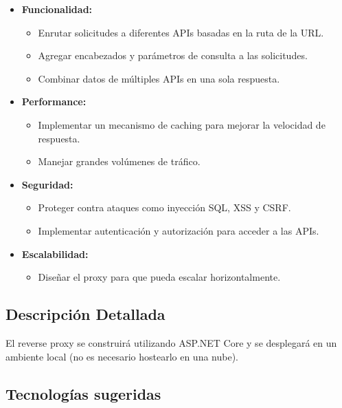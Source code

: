 \documentclass[
]{agujournal2019}
\providecommand{\tightlist}{%
  \setlength{\itemsep}{0pt}\setlength{\parskip}{0pt}}\usepackage{longtable,booktabs,array}
\begin{document}
\begin{itemize}
\tightlist
\item
  \textbf{Funcionalidad:}

  \begin{itemize}
  \tightlist
  \item
    Enrutar solicitudes a diferentes APIs basadas en la ruta de la URL.
  \item
    Agregar encabezados y parámetros de consulta a las solicitudes.
  \item
    Combinar datos de múltiples APIs en una sola respuesta.
  \end{itemize}
\item
  \textbf{Performance:}

  \begin{itemize}
  \tightlist
  \item
    Implementar un mecanismo de caching para mejorar la velocidad de
    respuesta.
  \item
    Manejar grandes volúmenes de tráfico.
  \end{itemize}
\item
  \textbf{Seguridad:}

  \begin{itemize}
  \tightlist
  \item
    Proteger contra ataques como inyección SQL, XSS y CSRF.
  \item
    Implementar autenticación y autorización para acceder a las APIs.
  \end{itemize}
\item
  \textbf{Escalabilidad:}

  \begin{itemize}
  \tightlist
  \item
    Diseñar el proxy para que pueda escalar horizontalmente.
  \end{itemize}
\end{itemize}

\subsection{Descripción Detallada}\label{descripciuxf3n-detallada-1}

El reverse proxy se construirá utilizando ASP.NET Core y se desplegará
en un ambiente local (no es necesario hostearlo en una nube).

\subsection{Tecnologías sugeridas}\label{tecnologuxedas-sugeridas-2}
\end{document}

